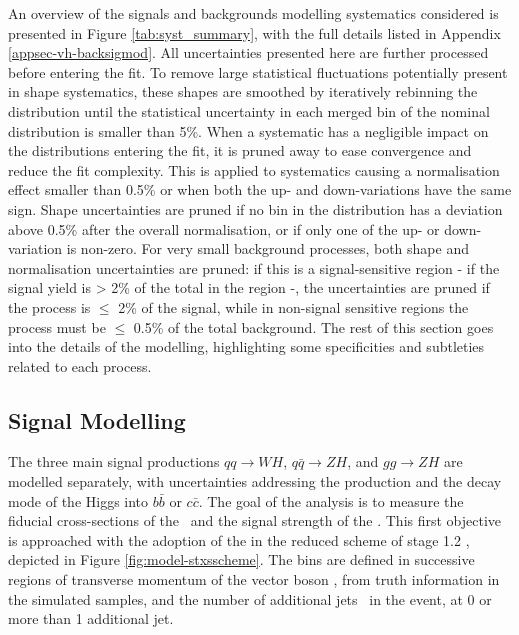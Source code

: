 An overview of the signals and backgrounds modelling systematics considered is presented in Figure \ref{tab:syst_summary}, with the full details listed in Appendix \ref{appsec-vh-backsigmod}. All uncertainties presented here are further processed before entering the fit. To remove large statistical fluctuations potentially present in shape systematics, these shapes are smoothed by iteratively rebinning the distribution until the statistical uncertainty in each merged bin of the nominal distribution is smaller than 5\%. When a systematic has a negligible impact on the distributions entering the fit, it is pruned away to ease convergence and reduce the fit complexity. This is applied to systematics causing a normalisation effect smaller than 0.5\% or when both the up- and down-variations have the same sign. Shape uncertainties are pruned if no bin in the distribution has a deviation above 0.5\% after the overall normalisation, or if only one of the up- or down-variation is non-zero. For very small background processes, both shape and normalisation uncertainties are pruned: if this is a signal-sensitive region - if the signal yield is > 2\% of the total in the region -, the uncertainties are pruned if the process is $\leq$ 2\% of the signal, while in non-signal sensitive regions the process must be $\leq$ 0.5\% of the total background. The rest of this section goes into the details of the modelling, highlighting some specificities and subtleties related to each process. 

\subsection{Signal Modelling}\label{sec-modSignal}
The three main signal productions $qq \rightarrow WH$, $q\bar{q} \rightarrow ZH$, and $gg \rightarrow ZH$ are modelled separately, with uncertainties addressing the production and the decay mode of the Higgs into $b\bar{b}$ or $c\bar{c}$. The goal of the analysis is to measure the fiducial cross-sections of the \vhb\ and the signal strength of the \vhc. This first objective is approached with the adoption of the  in the reduced scheme of stage 1.2 \cite{badger2016les, berger2019simplified}, depicted in Figure \ref{fig:model-stxsscheme}. The bins are defined in successive regions of transverse momentum of the vector boson \ptv, from truth information in the simulated samples, and the number of additional jets \nj\ in the event, at 0 or more than 1 additional jet.
  
